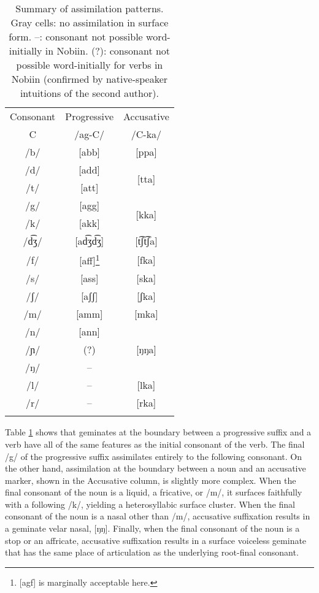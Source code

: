 \documentclass[output=paper]{langscibook}
\begin{document}
\begin{table}
\centering
\begin{tabular}{c c c}
\lsptoprule
Consonant & Progressive & Accusative\\
C & /ag-C/ & /C-ka/\\
\midrule
/b/ & [abb] %
& [ppa] \\
\midrule
/d/ & [add] %
& \multirow{2}{2em}{[tta]}  \\
/t/ &[att] %
& \\
\midrule
/g/ & [agg] %
& \multirow{2}{2em}{[kka]} \\
/k/ & [akk] %
& \\
\midrule
/d͡ʒ/ & [ad͡ʒd͡ʒ] %
& [t͡ʃt͡ʃa]\\
\midrule
/f/ & [aff]\footnote{[agf] is marginally acceptable here.} %
& \cellcolor{lightgray} [fka] \\
/s/ & [ass] %
& \cellcolor{lightgray} [ska] \\ 
/ʃ/ & [aʃʃ] %
& \cellcolor{lightgray} [ʃka] \\
\midrule
/m/ & [amm] %
& \cellcolor{lightgray} [mka] \\
\midrule
/n/ & [ann] %
& \multirow{3}{2em}{[ŋŋa]} \\
/ɲ/ & (?) & \\
/ŋ/ & -- & \\
\midrule
/l/ & -- & \cellcolor{lightgray} [lka]\\
/r/ & -- & \cellcolor{lightgray} [rka]\\
\lspbottomrule
\end{tabular}
\caption{Summary of assimilation patterns. Gray cells: no assimilation in surface form. --: consonant not possible word-initially in Nobiin. (?): consonant not possible word-initially for verbs in Nobiin (confirmed by native-speaker intuitions of the second author).\label{asssumm}}
\end{table}

Table \ref{asssumm} shows that geminates at the boundary between a progressive suffix and a verb have all of the same features as the initial consonant of the verb. The final /g/ of the progressive suffix assimilates entirely to the following consonant. On the other hand, assimilation at the boundary between a noun and an accusative marker, shown in the Accusative column, is slightly more complex. When the final consonant of the noun is a liquid, a fricative, or /m/, it surfaces faithfully with a following /k/, yielding a heterosyllabic surface cluster. When the final consonant of the noun is a nasal other than /m/, accusative suffixation results in a geminate velar nasal, [ŋŋ]. Finally, when the final consonant of the noun is a stop or an affricate, accusative suffixation results in a surface voiceless geminate that has the same place of articulation as the underlying root-final consonant.
\end{document}
